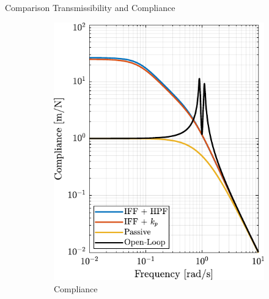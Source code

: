 \documentclass[t, minted]{clean-beamer}
\begin{document}
\begin{frame}[label={sec:org9effb95}]{Comparison Transmissibility and Compliance}
\begin{figure}[htbp]
\begin{subfigure}[c]{0.49\linewidth}
\includegraphics[width=\linewidth]{figs/comp_compliance.pdf}
\caption{\label{fig:comp_compliance} Compliance}
\end{subfigure}
\hfill
\begin{subfigure}[c]{0.49\linewidth}

\end{subfigure}
\end{figure}
\end{frame}
\end{document}
